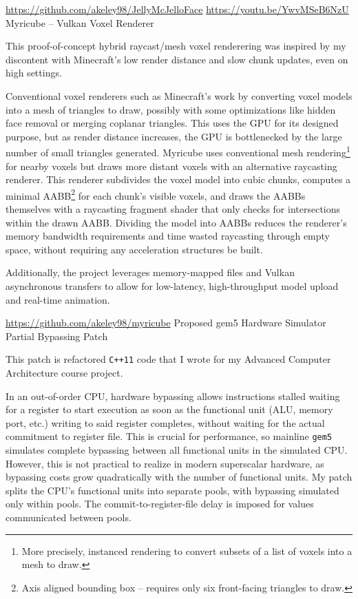 \documentclass[11pt]{article}
\newcommand{\web}[1]{{\color{webColor} \small \url{#1}}}
\newcommand{\mySub}[1]{{\color{subColor}\hspace{-6mm} \textsf{#1}}}
\newcommand{\lighttt}[1]{{\color{lightttColor}\texttt{#1}}}
\begin{document}
\web{https://github.com/akeley98/JellyMcJelloFace}
\hfill\web{https://youtu.be/YwvMSeB6NzU}
\filbreak
\mySub{Myricube -- Vulkan Voxel Renderer}

This proof-of-concept hybrid raycast/mesh voxel renderering was
inspired by my discontent with Minecraft's low render distance and
slow chunk updates, even on high settings.

Conventional voxel renderers such as Minecraft's work by converting
voxel models into a mesh of triangles to draw, possibly with some
optimizations like hidden face removal or merging coplanar
triangles. This uses the GPU for its designed purpose, but as render
distance increases, the GPU is bottlenecked by the large number of
small triangles generated. Myricube uses conventional mesh
rendering\footnote{More precisely, instanced rendering to convert
subsets of a list of voxels into a mesh to draw.} for nearby voxels
but draws more distant voxels with an alternative raycasting
renderer. This renderer subdivides the voxel model into cubic chunks,
computes a minimal AABB\footnote{Axis aligned bounding box -- requires
only six front-facing triangles to draw.} for each chunk's visible
voxels, and draws the AABBs themselves with a raycasting fragment
shader that only checks for intersections within the drawn AABB.
Dividing the model into AABBs reduces the renderer's memory bandwidth
requirements and time wasted raycasting through empty space, without
requiring any acceleration structures be built.

Additionally, the project leverages memory-mapped files and Vulkan
asynchronous transfers to allow for low-latency, high-throughput model
upload and real-time animation.

\web{https://github.com/akeley98/myricube}
\filbreak
\mySub{Proposed gem5 Hardware Simulator Partial Bypassing Patch}

This patch is refactored \lighttt{C++11} code that I wrote for my
Advanced Computer Architecture course project.

In an out-of-order CPU, hardware bypassing allows instructions stalled
waiting for a register to start execution as soon as the functional
unit (ALU, memory port, etc.) writing to said register completes,
without waiting for the actual commitment to register file. This is
crucial for performance, so mainline \lighttt{gem5} simulates complete
bypassing between all functional units in the simulated CPU. However,
this is not practical to realize in modern superscalar hardware, as
bypassing costs grow quadratically with the number of functional
units. My patch splits the CPU's functional units into separate pools,
with bypassing simulated only within pools. The
commit-to-register-file delay is imposed for values communicated
between pools.
\end{document}
